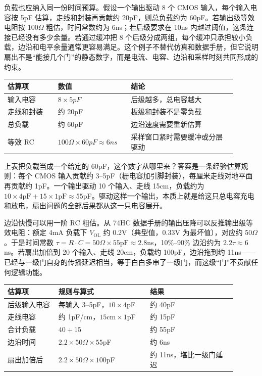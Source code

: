 负载也应纳入同一份时间预算。假设一个输出驱动 8 个 CMOS 输入，每个输入电容按 5pF 估算，走线和封装再贡献约 20pF，则总负载约为 60pF。若输出级等效电阻按 100$\Omega$ 粗估，时间常数约为 6ns；若后级要求在 10ns 内越过阈值，这条连接已经没有多少余量。若通过缓冲把 8 个后级分成两组，每个缓冲只承担较小负载，边沿和电平余量通常更容易满足。这个例子不替代仿真和数据手册，但它说明扇出不是“能接几个门”的静态数字，而是电流、电容、边沿和采样时刻共同形成的约束。

\begin{longtable}{L{0.2\linewidth}L{0.28\linewidth}L{0.42\linewidth}}
\toprule
估算项 & 数值 & 结论 \\
\midrule
输入电容 & $8 \times 5pF$ & 后级越多，总电容越大 \\
走线和封装 & 约 20pF & 板级和封装不是零负载 \\
总负载 & 约 60pF & 边沿速度需要重新估算 \\
等效 RC & $100\Omega \times 60pF \approx 6ns$ & 采样窗口紧时需要缓冲或分层驱动 \\
\bottomrule
\end{longtable}

上表把负载当成一个给定的 60pF，这个数字从哪里来？答案是一条经验估算规则：每个 CMOS 输入贡献约 3–5pF（栅电容加引脚封装），每厘米走线对地平面再贡献约 1pF。一个输出驱动 10 个输入、走线 15cm，负载约为 $10\times4\mathrm{pF}+15\times1\mathrm{pF}\approx55$pF。驱动这样一个输出，本质上就是给这只总电容充电和放电，扇出问题的全部后果都从这一只电容展开。

边沿快慢可以用一阶 RC 粗估。从 74HC 数据手册的输出压降可以反推输出级等效电阻：额定 4mA 负载下 $V_\mathrm{OL}$ 约 0.2V（典型值，0.33V 为最坏值），对应约 50$\Omega$。于是时间常数 $\tau = R\cdot C = 50\Omega\times55\mathrm{pF}\approx2.8$ns，10\%–90\% 边沿约为 $2.2\tau\approx6$ns。若扇出加倍到 20 个输入、走线 20cm，负载约 100pF，边沿拖到约 11ns——已经与一级门自身的传播延迟相当，等于白白多串了一级门，而这级“门”不贡献任何逻辑功能。

\begin{longtable}{L{0.2\linewidth}L{0.36\linewidth}L{0.34\linewidth}}
\toprule
估算项 & 规则与算式 & 结果 \\
\midrule
后级输入电容 & 每输入 3–5pF，$10\times4$pF & 约 40pF \\
走线电容 & 约 1pF/cm，$15\mathrm{cm}\times1$pF & 约 15pF \\
合计负载 & $40+15$ & 约 55pF \\
边沿时间 & $2.2\times50\Omega\times55$pF & 约 6ns \\
扇出加倍后 & $2.2\times50\Omega\times100$pF & 约 11ns，堪比一级门延迟 \\
\bottomrule
\end{longtable}

